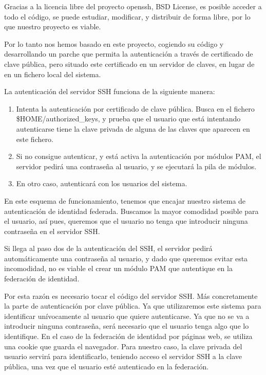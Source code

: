     Gracias a la licencia libre del proyecto openssh, BSD License, es
    posible acceder a todo el código, se puede estudiar, modificar, y
    distribuir de forma libre, por lo que nuestro proyecto es viable.

    Por lo tanto nos hemos basado en este proyecto, cogiendo su código y
    desarrollando un parche que permita la autenticación a través de
    certificado de clave pública, pero situado este certificado en un
    servidor de claves, en lugar de en un fichero local del sistema.

    La autenticación del servidor SSH funciona de la siguiente manera:

    \begin{enumerate}

    \item Intenta la autenticación por certificado de clave pública. Busca
    en el fichero \$HOME/authorized\_keys, y prueba que el usuario que está
    intentando autenticarse tiene la clave privada de alguna de las claves
    que aparecen en este fichero.

    \item Si no consigue autenticar, y está activa la autenticación por
    módulos PAM, el servidor pedirá una contraseña al usuario, y se
    ejecutará la pila de módulos.

    \item En otro caso, autenticará con los usuarios del sistema.

    \end{enumerate}

    En este esquema de funcionamiento, tenemos que encajar nuestro sistema
    de autenticación de identidad federada. Buscamos la mayor comodidad
    posible para el usuario, así pues, queremos que el usuario no tenga que
    introducir ninguna contraseña en el servidor SSH.

    Si llega al paso dos de la autenticación del SSH, el servidor pedirá
    automáticamente una contraseña al usuario, y dado que queremos evitar
    esta incomodidad, no es viable el crear un módulo PAM que autentique
    en la federación de identidad.

    Por esta razón es necesario tocar el código del servidor SSH. Más
    concretamente la parte de autenticación por clave pública. Ya que
    utilizaremos este sistema para identificar unívocamente al usuario que
    quiere autenticarse. Ya que no se va a introducir ninguna contraseña,
    será necesario que el usuario tenga algo que lo identifique. En el caso
    de la federación de identidad por páginas web, se utiliza una cookie
    que guarda el navegador. Para nuestro caso, la clave privada del
    usuario servirá para identificarlo, teniendo acceso el servidor SSH a
    la clave pública, una vez que el usuario esté autenticado en la
    federación.

